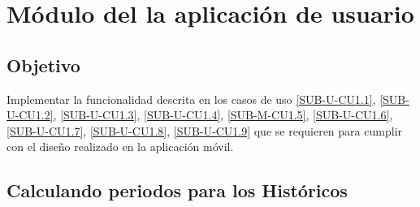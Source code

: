 
\section{Módulo del la aplicación de usuario}
\subsection{Objetivo}
Implementar la funcionalidad descrita en los casos de uso \ref{SUB-U-CU1.1}, \ref{SUB-U-CU1.2}, \ref{SUB-U-CU1.3}, \ref{SUB-U-CU1.4}, \ref{SUB-M-CU1.5}, \ref{SUB-U-CU1.6}, \ref{SUB-U-CU1.7}, \ref{SUB-U-CU1.8}, \ref{SUB-U-CU1.9} que se requieren para cumplir con el diseño realizado en la aplicación móvil. 

\subsection{Calculando periodos para los Históricos}

